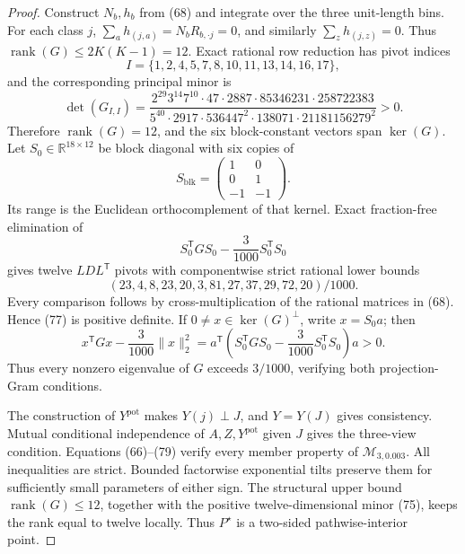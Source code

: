 \documentclass{article}
\begin{document}
\begin{proof}
Construct \(N_b,h_b\) from (68) and integrate over the three unit-length bins.  For each class \(j\),
\(\sum_a h_{(j,a)}=N_bR_{b,\cdot j}=0\), and similarly
\(\sum_z h_{(j,z)}=0\).  Thus \(\operatorname{rank}(G)\leq2K(K-1)=12\).  Exact rational row reduction has pivot indices
\[
 I=\{1,2,4,5,7,8,10,11,13,14,16,17\}, \tag{74}
\]
and the corresponding principal minor is
\[
 \det(G_{I,I})=
 \frac{2^{29}3^{14}7^{10}\cdot47\cdot2887\cdot85346231\cdot258722383}
 {5^{40}\cdot2917\cdot536447^2\cdot138071\cdot21181156279^2}>0. \tag{75}
\]
Therefore \(\operatorname{rank}(G)=12\), and the six block-constant vectors span \(\ker(G)\).  Let \(S_0\in\mathbb R^{18\times12}\) be block diagonal with six copies of
\[
 S_{\mathrm{blk}}=
 \begin{pmatrix}1&0\\0&1\\-1&-1\end{pmatrix}. \tag{76}
\]
Its range is the Euclidean orthocomplement of that kernel.  Exact fraction-free elimination of
\[
 S_0^{\mathsf T}GS_0-\frac3{1000}S_0^{\mathsf T}S_0 \tag{77}
\]
gives twelve \(LDL^{\mathsf T}\) pivots with componentwise strict rational lower bounds
\[
 (23,4,8,23,20,3,81,27,37,29,72,20)/1000. \tag{78}
\]
Every comparison follows by cross-multiplication of the rational matrices in (68).  Hence (77) is positive definite.  If \(0\ne x\in\ker(G)^\perp\), write \(x=S_0a\); then
\[
 x^{\mathsf T}Gx-\frac3{1000}\|x\|_2^2
 =a^{\mathsf T}\left(S_0^{\mathsf T}GS_0-\frac3{1000}S_0^{\mathsf T}S_0\right)a>0. \tag{79}
\]
Thus every nonzero eigenvalue of \(G\) exceeds \(3/1000\), verifying both projection-Gram conditions.

The construction of \(Y^{\mathrm{pot}}\) makes \(Y(j)\perp J\), and \(Y=Y(J)\) gives consistency.  Mutual conditional independence of \(A,Z,Y^{\mathrm{pot}}\) given \(J\) gives the three-view condition.  Equations (66)--(79) verify every member property of \(\mathcal M_{3,0.003}\).  All inequalities are strict.  Bounded factorwise exponential tilts preserve them for sufficiently small parameters of either sign.  The structural upper bound \(\operatorname{rank}(G)\leq12\), together with the positive twelve-dimensional minor (75), keeps the rank equal to twelve locally.  Thus \(P^\star\) is a two-sided pathwise-interior point.


\end{proof}
\end{document}
